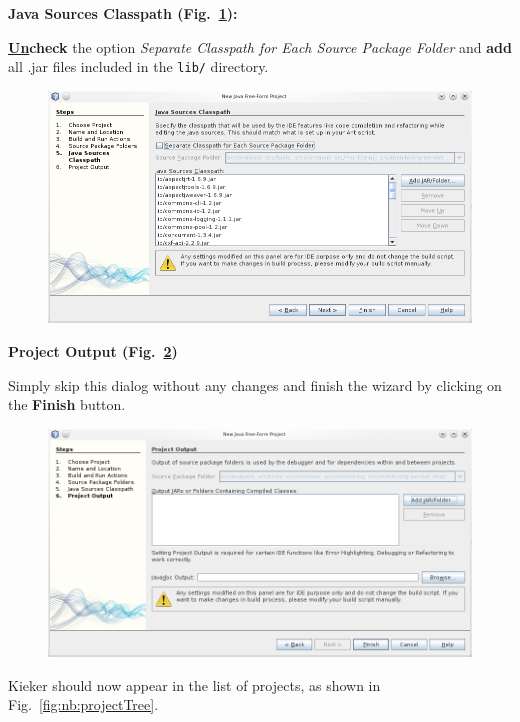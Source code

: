 \begin{compactenum}
\begin{compactenum}
\item \textbf{Java Sources Classpath (Fig.~\ref{fig:nb:sourcesclasspath}):} %

\textbf{\underline{Un}check} the option \textit{Separate Classpath for Each Source Package Folder} and %
\textbf{add} all .jar files included in the \texttt{lib/} directory.

\begin{figure}[H]\centering
\includegraphics[scale=0.4]{figures/netbeans-SourcesClasspath}
\caption{}
\label{fig:nb:sourcesclasspath}
\end{figure}

\item \textbf{Project Output (Fig.~\ref{fig:nb:projectOutput})} %

Simply skip this dialog without any changes and finish the wizard by clicking %
on the \textbf{Finish} button.

\begin{figure}[H]\centering
\includegraphics[scale=0.4]{figures/netbeans-ProjectOutput}
\caption{}
\label{fig:nb:projectOutput}
\end{figure}

\item Kieker should now appear in the list of projects, as shown in Fig.~\ref{fig:nb:projectTree}.  


\end{compactenum}
\end{compactenum}
